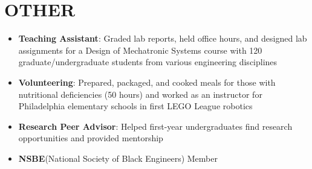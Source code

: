 \section{\textbf{OTHER}}
\begin{minipage}[t]{\linewidth}
    \begin{itemize}[nosep,after=\strut, leftmargin=1em, itemsep=2pt]
        \item \textbf{Teaching Assistant}: Graded lab reports, held office hours, and designed lab assignments for a Design of Mechatronic Systems course with 120 graduate/undergraduate students from various engineering disciplines
        \item \textbf{Volunteering}: Prepared, packaged, and cooked meals for those with nutritional deficiencies (50 hours) and worked as an instructor for Philadelphia elementary schools in first LEGO League robotics  
        \item \textbf{Research Peer Advisor}: Helped first-year undergraduates find research opportunities and provided mentorship
        \item \textbf{NSBE}(National Society of Black Engineers) Member
    \end{itemize}
\end{minipage}